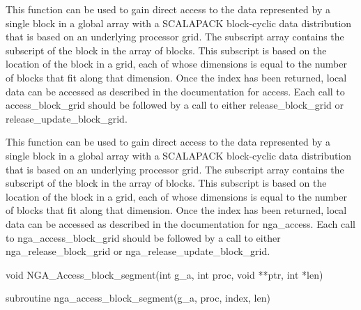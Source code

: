 \documentclass[12pt]{article}
\begin{document}
\begin{pydesc}
This function can be used to gain direct access to the data represented by a
single block in a global array with a SCALAPACK block-cyclic data distribution
that is based on an underlying processor grid. The subscript array contains the
subscript of the block in the array of blocks. This subscript is based on the
location of the block in a grid, each of whose dimensions is equal to the
number of blocks that fit along that dimension. Once the index has been
returned, local data can be accessed as described in the documentation for
access. Each call to access_block_grid should be followed by a call to
either release_block_grid or release_update_block_grid.
\end{pydesc}

\begin{fdesc}
This function can be used to gain direct access to the data represented by a
single block in a global array with a SCALAPACK block-cyclic data distribution
that is based on an underlying processor grid. The subscript array contains the
subscript of the block in the array of blocks. This subscript is based on the
location of the block in a grid, each of whose dimensions is equal to the
number of blocks that fit along that dimension. Once the index has been
returned, local data can be accessed as described in the documentation for
nga_access. Each call to nga_access_block_grid should be followed by a call to
either nga_release_block_grid or nga_release_update_block_grid.
\end{fdesc}



\begin{capi}
\begin{ccode}
void NGA_Access_block_segment(int g_a, int proc, void **ptr, int *len)
\end{ccode}
\begin{funcargs}
\end{funcargs}
\end{capi}

\begin{fapi}
\begin{fcode}
subroutine nga_access_block_segment(g_a, proc, index, len)
\end{fcode}
\begin{funcargs}
\end{funcargs}
\end{fapi}
\end{document}
